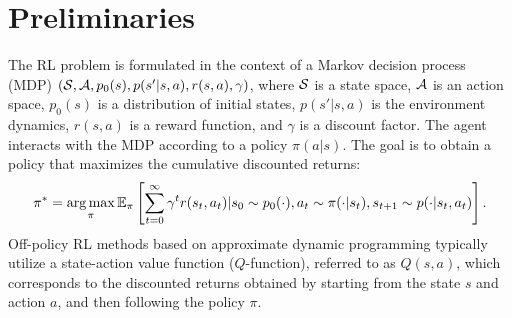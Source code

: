 \documentclass{article} %
\begin{document}


\section{Preliminaries}

The RL problem is formulated in the context of a Markov decision process (MDP) $(\mathcal{S}, \mathcal{A}, p_0(s), p(s'|s,a), r(s,a), \gamma)$, where $\mathcal{S}$ is a state space, $\mathcal{A}$ is an action space, $p_0(s)$ is a distribution of initial states, $p(s' | s, a)$ is the environment dynamics, $r(s,a)$ is a reward function, and $\gamma$ is a discount factor. The agent interacts with the MDP according to a policy $\pi(a|s)$. The goal is to obtain a policy that maximizes the cumulative discounted returns: 
\vspace{-0.2cm}
$$\pi^* = \operatorname*{arg\,max}_\pi \mathbb{E}_\pi\left[\sum_{t=0}^\infty\gamma^t r(s_t, a_t) | \allowbreak s_0 \sim p_0(\cdot), \allowbreak  a_t \sim \pi(\cdot|s_t), \allowbreak s_{t+1} \sim p(\cdot|s_t, a_t) \right].$$
Off-policy RL methods based on approximate dynamic programming typically utilize a state-action value function ($Q$-function), referred to as $Q(s, a)$, which corresponds to the discounted returns obtained by starting from the state $s$ and action $a$, and then following the policy $\pi$.
\vspace{-0.3cm}
\end{document}
